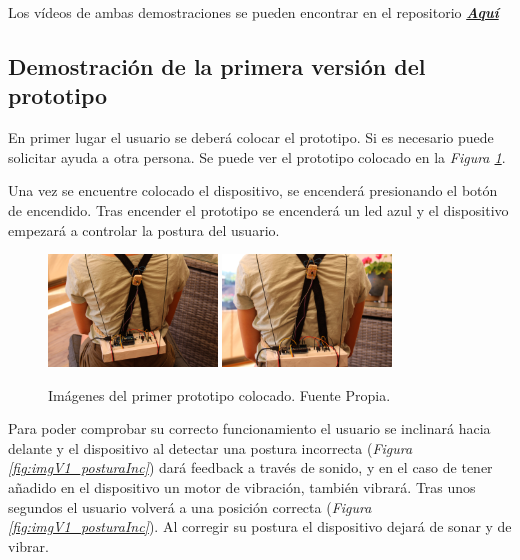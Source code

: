 Los vídeos de ambas demostraciones se pueden encontrar en el repositorio \href{https://github.com/NaiaraGadea/TFG_DispositivoDeControlPostural/tree/main/videos}{\textbf{\textit{Aquí}}}


\subsection{Demostración de la primera versión del prototipo}

En primer lugar el usuario se deberá colocar el prototipo. Si es necesario puede solicitar ayuda a otra persona. Se puede ver el prototipo colocado en la \textit{Figura \ref{fig:imgDispositivo_V1}}.

Una vez se encuentre colocado el dispositivo, se encenderá presionando el botón de encendido. Tras encender el prototipo se encenderá un led azul y el dispositivo empezará a controlar la postura del usuario.


\begin{figure}[h!]
    \centering
    \includegraphics[width=0.4\textwidth]{img/Disp_V1_1.jpg}
    \includegraphics[width=0.4\textwidth]{img/Disp_V1_2.jpg}
    \caption{Imágenes del primer prototipo colocado. Fuente Propia.}
    \label{fig:imgDispositivo_V1} 
\end{figure}

Para poder comprobar su correcto funcionamiento el usuario se inclinará hacia delante y el dispositivo al detectar una postura incorrecta (\textit{Figura \ref{fig:imgV1_posturaInc}}) dará feedback a través de sonido, y en el caso de tener añadido en el dispositivo un motor de vibración, también vibrará. Tras unos segundos el usuario volverá a una posición correcta (\textit{Figura \ref{fig:imgV1_posturaInc}}). Al corregir su postura el dispositivo dejará de sonar y de vibrar.

